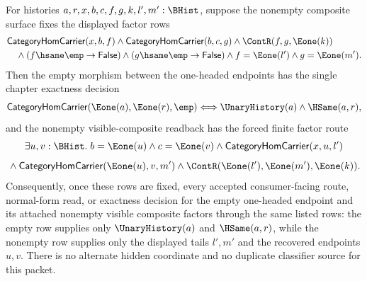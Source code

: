 \begin{corollary}
\label{cor:category-empty-e1-endpoint-consumer-determinacy}
For histories $a,r,x,b,c,f,g,k,l',m':\BHist$, suppose the nonempty composite
surface fixes the displayed factor rows
$$
\begin{aligned}
&\mathsf{CategoryHomCarrier}(x,b,f)\land
\mathsf{CategoryHomCarrier}(b,c,g)\land
\ContR(f,g,\Eone(k))\\
&\quad\land (f\hsame\emp\to\mathsf{False})\land
(g\hsame\emp\to\mathsf{False})\land f=\Eone(l')\land g=\Eone(m').
\end{aligned}
$$
Then the empty morphism between the one-headed endpoints has the single
chapter exactness decision
$$
\mathsf{CategoryHomCarrier}(\Eone(a),\Eone(r),\emp)
\Longleftrightarrow
\UnaryHistory(a)\land\HSame(a,r),
$$
and the nonempty visible-composite readback has the forced finite factor route
$$
\exists u,v:\BHist.\;
b=\Eone(u)\land c=\Eone(v)\land
\mathsf{CategoryHomCarrier}(x,u,l')
$$
$$
{}\land
\mathsf{CategoryHomCarrier}(\Eone(u),v,m')\land
\ContR(\Eone(l'),\Eone(m'),\Eone(k)).
$$
Consequently, once these rows are fixed, every accepted consumer-facing route,
normal-form read, or exactness decision for the empty one-headed endpoint and
its attached nonempty visible composite factors through the same listed rows:
the empty row supplies only $\UnaryHistory(a)$ and $\HSame(a,r)$, while
the nonempty row supplies only the displayed tails $l',m'$ and the recovered
endpoints $u,v$. There is no alternate hidden coordinate and no duplicate
classifier source for this packet.
\end{corollary}
